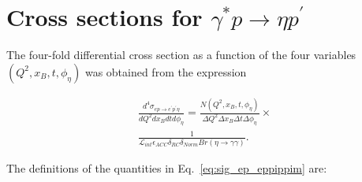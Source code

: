 \documentclass[prc,aps,floatfix,showpacs,showkeys,twocolumn,superscriptaddress,letterpaper,10pt]{revtex4-1}
\begin{document}
  




\section{Cross sections for $\gamma^*p\to \eta p^\prime$}
The four-fold differential cross section as a function of the four variables $(Q^2,x_B,t ,\phi_\eta)$ was obtained from the expression

\begin{equation}
\begin{split}
\frac{d^4 \sigma_{ep \rightarrow e^\prime p^\prime \eta}}{dQ^2 dx_B dt d\phi_\eta} = 
 \frac{N(Q^2,x_B,t,\phi_\eta)}{ \Delta Q^2  \Delta x_B \Delta t \Delta \phi_\eta} \times \\
\frac{1}{\mathcal{L}_{int}\epsilon_{ACC}\delta_{RC} \delta_{Norm}Br(\eta\to\gamma\gamma)}.
\end{split}
\label{eq:sig_ep_eppippim}
\end{equation}


\noindent The definitions of the  quantities in Eq.~\ref{eq:sig_ep_eppippim}  are:
\end{document}
